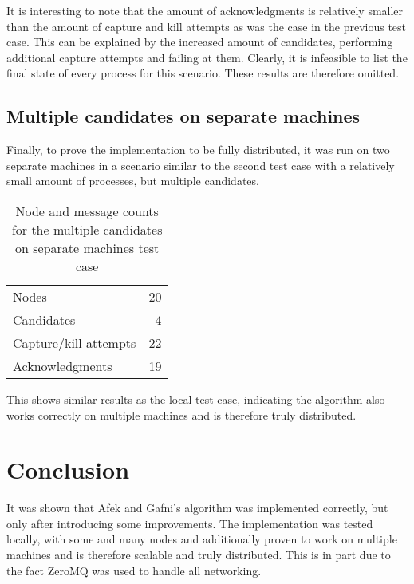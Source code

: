 \documentclass{article}
\begin{document}
It is interesting to note that the amount of acknowledgments is relatively smaller than the amount of capture and kill attempts as was the case in the previous test case. This can be explained by the increased amount of candidates, performing additional capture attempts and failing at them. Clearly, it is infeasible to list the final state of every process for this scenario. These results are therefore omitted.

\subsection{Multiple candidates on separate machines}
Finally, to prove the implementation to be fully distributed, it was run on two separate machines in a scenario similar to the second test case with a relatively small amount of processes, but multiple candidates.

\begin{table}[H]
	\centering
	\caption{Node and message counts for the multiple candidates on separate machines test case}
	\begin{tabular}{l r}
		\toprule
		Nodes 					& 20	\\
		Candidates 				& 4 	\\
		Capture/kill attempts 	& 22	\\
		Acknowledgments 		& 19	\\
		\bottomrule
	\end{tabular}
	\label{tab:counts-separate}
\end{table}

This shows similar results as the local test case, indicating the algorithm also works correctly on multiple machines and is therefore truly distributed.

\section{Conclusion}
It was shown that Afek and Gafni's algorithm was implemented correctly, but only after introducing some improvements. The implementation was tested locally, with some and many nodes and additionally proven to work on multiple machines and is therefore scalable and truly distributed. This is in part due to the fact ZeroMQ was used to handle all networking.

\printbibliography
\end{document}

